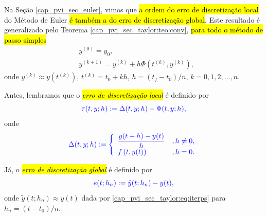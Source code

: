 Na Seção \ref{cap_pvi_sec_euler}, vimos que \hl{a ordem do erro de discretização local} do Método de Euler{\euler} \hl{é também a do erro de discretização global}. Este resultado é generalizado pelo Teorema \ref{cap_pvi_sec_taylor:teo:conv}, \hl{para todo o método de passo simples}
\begin{subequations}\label{cap_pvi_sec_taylor:eq:iterps}
  \begin{align}
    &y^{(0)} = y_0,\\
    &y^{(k+1)} = y^{(k)} + h\Phi\left(t^{(k)}, y^{(k)}\right),
  \end{align}
\end{subequations}
onde $y^{(k)}\approx y\left(t^{(k)}\right)$, $t^{(k)} = t_0 + kh$, $h = (t_f-t_0)/n$, $k = 0, 1, 2, \dotsc, n$.

Antes, lembramos que o \hl{\emph{erro de discretização local}} é definido por
\begin{equation}\label{cap_pvi_sec_taylor:eq:def_erro_local}\color{blue}\tau(t, y; h) := \Delta(t, y; h) - \Phi(t, y; h),
\end{equation}
onde
\begin{equation}\color{blue}\Delta(t, y; h) := \left\{
    \begin{array}{ll}
      \displaystyle\frac{y(t+h) - y(t)}{h} &, h\neq 0,\\
      f\left(t, y(t)\right) &, h=0.
    \end{array}
  \right.
\end{equation}

Já, o \hl{\emph{erro de discretização global}} é definido por
\begin{equation}\color{blue}e(t; h_n) := \tilde{y}(t; h_n) - y(t),
\end{equation}
onde $\tilde{y}(t; h_n) \approx y(t)$ dada por \eqref{cap_pvi_sec_taylor:eq:iterps} para $h_n = (t-t_0)/n$.

